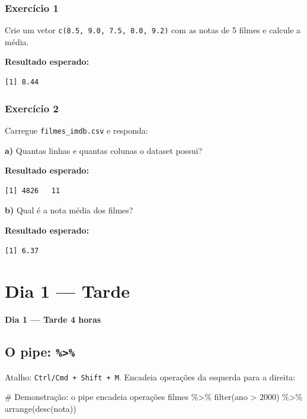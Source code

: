\documentclass[
  letterpaper,
]{scrbook}
\newenvironment{Shaded}{\begin{snugshade}}{\end{snugshade}}
\newcommand{\CommentTok}[1]{\textcolor[rgb]{0.37,0.37,0.37}{#1}}
\newcommand{\DecValTok}[1]{\textcolor[rgb]{0.68,0.00,0.00}{#1}}
\newcommand{\FunctionTok}[1]{\textcolor[rgb]{0.28,0.35,0.67}{#1}}
\newcommand{\NormalTok}[1]{\textcolor[rgb]{0.00,0.23,0.31}{#1}}
\newcommand{\SpecialCharTok}[1]{\textcolor[rgb]{0.37,0.37,0.37}{#1}}
\begin{document}
\subsection{Exercício 1}\label{exercuxedcio-1-3}

Crie um vetor \texttt{c(8.5,\ 9.0,\ 7.5,\ 8.0,\ 9.2)} com as notas de 5
filmes e calcule a média.

\textbf{Resultado esperado:}

\begin{verbatim}
[1] 8.44
\end{verbatim}

\subsection{Exercício 2}\label{exercuxedcio-2-3}

Carregue \texttt{filmes\_imdb.csv} e responda:

\textbf{a)} Quantas linhas e quantas colunas o dataset possui?

\textbf{Resultado esperado:}

\begin{verbatim}
[1] 4826   11
\end{verbatim}

\textbf{b)} Qual é a nota média dos filmes?

\textbf{Resultado esperado:}

\begin{verbatim}
[1] 6.37
\end{verbatim}

\chapter{Dia 1 --- Tarde}\label{dia-1-tarde-1}

\textbf{Dia 1 --- Tarde \textbar{} 4 horas}

\section*{\texorpdfstring{O pipe:
\texttt{\%\textgreater{}\%}}{O pipe: \%\textgreater\%}}\label{o-pipe}


Atalho: \texttt{Ctrl/Cmd\ +\ Shift\ +\ M}. Encadeia operações da
esquerda para a direita:

\begin{Shaded}
\begin{Highlighting}[]
\CommentTok{\# Demonstração: o pipe encadeia operações}
\NormalTok{filmes }\SpecialCharTok{\%\textgreater{}\%}
  \FunctionTok{filter}\NormalTok{(ano }\SpecialCharTok{\textgreater{}} \DecValTok{2000}\NormalTok{) }\SpecialCharTok{\%\textgreater{}\%}
  \FunctionTok{arrange}\NormalTok{(}\FunctionTok{desc}\NormalTok{(nota))}
\end{Highlighting}
\end{Shaded}
\end{document}
